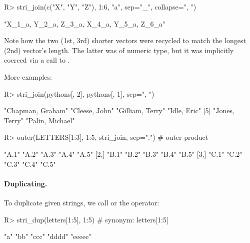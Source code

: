 \documentclass[nojss]{jss}
\begin{document}
\begin{Schunk}
\begin{Sinput}
R> stri_join(c("X", "Y", "Z"), 1:6, "a", sep="_", collapse=", ")
\end{Sinput}
\begin{Soutput}
[1] "X_1_a, Y_2_a, Z_3_a, X_4_a, Y_5_a, Z_6_a"
\end{Soutput}
\end{Schunk}



\noindent
Note how the two (1st, 3rd) shorter vectors were {recycled} to match
the longest (2nd) vector's length. The latter was of numeric type,
but it was implicitly coerced via a call to .




\ifnotJSSversion
More examples:

\begin{Schunk}
\begin{Sinput}
R> stri_join(pythons[, 2], pythons[, 1], sep=", ")
\end{Sinput}
\begin{Soutput}
[1] "Chapman, Graham" "Cleese, John"    "Gilliam, Terry"  "Idle, Eric"
[5] "Jones, Terry"    "Palin, Michael"
\end{Soutput}
\begin{Sinput}
R> outer(LETTERS[1:3], 1:5, stri_join, sep=".")  # outer product
\end{Sinput}
\begin{Soutput}
     [,1]  [,2]  [,3]  [,4]  [,5]
[1,] "A.1" "A.2" "A.3" "A.4" "A.5"
[2,] "B.1" "B.2" "B.3" "B.4" "B.5"
[3,] "C.1" "C.2" "C.3" "C.4" "C.5"
\end{Soutput}
\end{Schunk}
\fi



\paragraph{Duplicating.}
To duplicate given strings, we call
 or the  operator:


\begin{Schunk}
\begin{Sinput}
R> stri_dup(letters[1:5], 1:5)  # synonym: letters[1:5] %s*% 1:5
\end{Sinput}
\begin{Soutput}
[1] "a"     "bb"    "ccc"   "dddd"  "eeeee"
\end{Soutput}
\end{Schunk}
\end{document}
